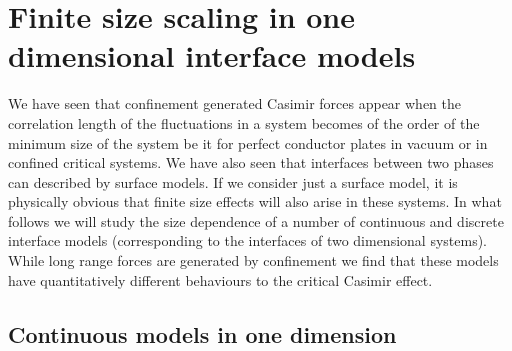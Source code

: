 \section{Finite size scaling in one dimensional interface models}
{\color{red}
We have seen that confinement generated Casimir forces appear when the correlation length of the fluctuations in a system becomes of the order of the minimum size of the system  be it for perfect conductor plates in vacuum or in confined critical systems. We have also seen that interfaces between two phases can described by surface models. If we consider just a surface model, it is physically obvious that finite size effects will also arise in these systems. In what follows we will study the size dependence of a number of continuous and discrete interface models (corresponding to the interfaces of two dimensional systems). While long range forces are generated by confinement we find that these models have quantitatively different behaviours to the critical Casimir effect.
}
\subsection{Continuous models in one dimension}

